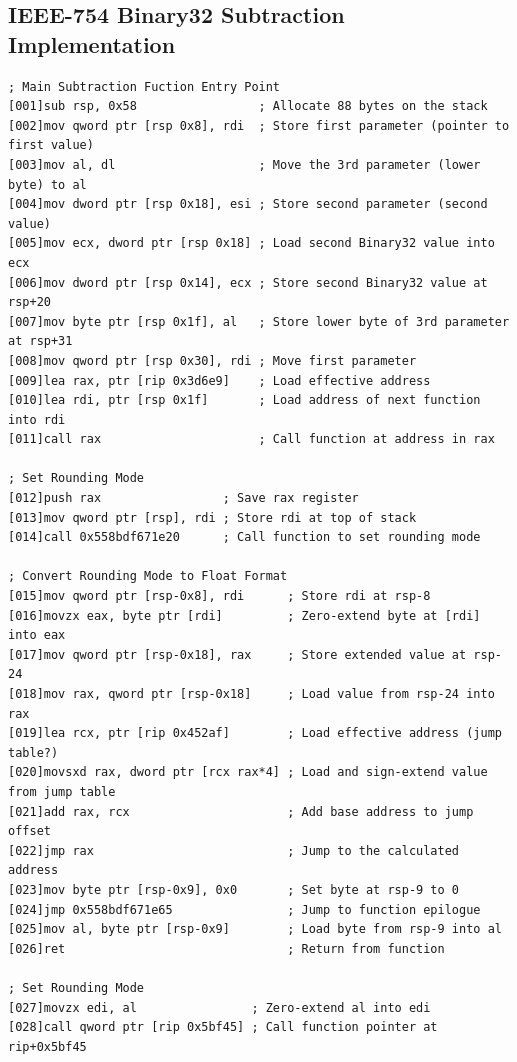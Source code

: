 \documentclass[12pt,letter]{article}
\begin{document}
\subsection*{IEEE-754 Binary32 Subtraction Implementation}

\begin{lstlisting}[style=rust, caption={Annotated Binary32 Normal Case Subtraction Instruction Trace}, label={fig:ieee_subtract}]
; Main Subtraction Fuction Entry Point
[001]sub rsp, 0x58                 ; Allocate 88 bytes on the stack
[002]mov qword ptr [rsp 0x8], rdi  ; Store first parameter (pointer to first value)
[003]mov al, dl                    ; Move the 3rd parameter (lower byte) to al
[004]mov dword ptr [rsp 0x18], esi ; Store second parameter (second value)
[005]mov ecx, dword ptr [rsp 0x18] ; Load second Binary32 value into ecx
[006]mov dword ptr [rsp 0x14], ecx ; Store second Binary32 value at rsp+20
[007]mov byte ptr [rsp 0x1f], al   ; Store lower byte of 3rd parameter at rsp+31
[008]mov qword ptr [rsp 0x30], rdi ; Move first parameter
[009]lea rax, ptr [rip 0x3d6e9]    ; Load effective address
[010]lea rdi, ptr [rsp 0x1f]       ; Load address of next function into rdi
[011]call rax                      ; Call function at address in rax

; Set Rounding Mode
[012]push rax                 ; Save rax register
[013]mov qword ptr [rsp], rdi ; Store rdi at top of stack
[014]call 0x558bdf671e20      ; Call function to set rounding mode

; Convert Rounding Mode to Float Format
[015]mov qword ptr [rsp-0x8], rdi      ; Store rdi at rsp-8
[016]movzx eax, byte ptr [rdi]         ; Zero-extend byte at [rdi] into eax
[017]mov qword ptr [rsp-0x18], rax     ; Store extended value at rsp-24
[018]mov rax, qword ptr [rsp-0x18]     ; Load value from rsp-24 into rax
[019]lea rcx, ptr [rip 0x452af]        ; Load effective address (jump table?)
[020]movsxd rax, dword ptr [rcx rax*4] ; Load and sign-extend value from jump table
[021]add rax, rcx                      ; Add base address to jump offset
[022]jmp rax                           ; Jump to the calculated address
[023]mov byte ptr [rsp-0x9], 0x0       ; Set byte at rsp-9 to 0
[024]jmp 0x558bdf671e65                ; Jump to function epilogue
[025]mov al, byte ptr [rsp-0x9]        ; Load byte from rsp-9 into al
[026]ret                               ; Return from function

; Set Rounding Mode
[027]movzx edi, al                ; Zero-extend al into edi
[028]call qword ptr [rip 0x5bf45] ; Call function pointer at rip+0x5bf45


\end{lstlisting}
\end{document}
